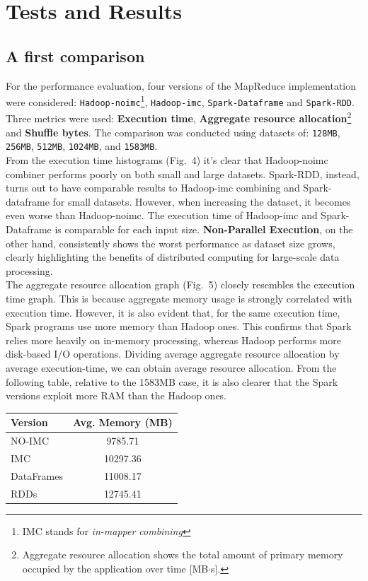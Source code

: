 \section{Tests and Results}

\subsection{A first comparison}
For the performance evaluation, four versions of the MapReduce implementation were considered: 
\texttt{Hadoop-noimc}\footnote{IMC stands for \textit{in-mapper combining}}, 
\texttt{Hadoop-imc}, \texttt{Spark-Dataframe} and \texttt{Spark-RDD}. Three metrics were used: \textbf{Execution time}, \textbf{Aggregate resource allocation}\footnote{Aggregate resource allocation shows the total amount of primary memory occupied by the application over time [MB$\cdot$s].} and \textbf{Shuffle bytes}. The comparison was conducted using datasets of: 
\texttt{128MB}, \texttt{256MB}, \texttt{512MB}, \texttt{1024MB}, and \texttt{1583MB}.\\
From the execution time histograms (Fig.~4) it's clear that Hadoop-noimc combiner performs poorly on both small and large datasets. Spark-RDD, instead, turns out to have comparable results to Hadoop-imc combining and Spark-dataframe for small datasets. However, when increasing the dataset, it becomes even worse than Hadoop-noimc. The execution time of Hadoop-imc and Spark-Dataframe is comparable for each input size. \textbf{Non-Parallel Execution}, on the other hand, consistently shows the worst performance as dataset size grows, clearly highlighting the benefits of distributed computing for large-scale data processing.\\
The aggregate resource allocation graph (Fig.~5) closely resembles the execution time graph. This is because aggregate memory usage is strongly correlated with execution time. However, it is also evident that, for the same execution time, Spark programs use more memory than Hadoop ones. This confirms that Spark relies more heavily on in-memory processing, whereas Hadoop performs more disk-based I/O operations. Dividing average aggregate resource allocation by average execution-time, we can obtain average resource allocation. From the following table, relative to the 1583MB case, it is also clearer that the Spark versions exploit more RAM than the Hadoop ones.
\begin{table}[H]
	\centering
	\begin{tabular}{lc}
		\hline
		\textbf{Version} & \textbf{Avg. Memory (MB)} \\
		\hline
		NO-IMC    & 9785.71 \\
		IMC  & 10297.36 \\
		DataFrames & 11008.17 \\
		RDDs       & 12745.41 \\
		\hline
	\end{tabular}
	\label{tab:avg-mem}
\end{table}
